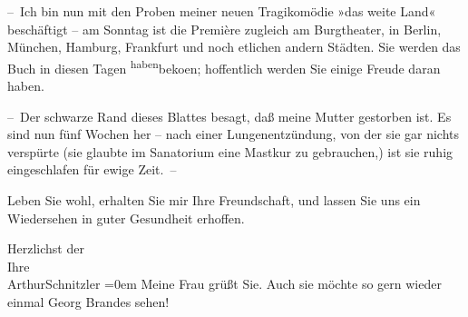 \pstart
           – Ich bin nun mit den Proben meiner {\pb}neuen
               Tragikomödie »das weite Land« beschäftigt – am
               Sonntag ist die Première zugleich am Burgtheater,
               in Berlin, München, Hamburg, Frankfurt und noch etlichen andern Städten. Sie werden das Buch in diesen Tagen \substVorne{}\textsuperscript{haben}\substDazwischen{}beko{\geminationm}en\substHinten{}; hoffentlich werden Sie einige Freude daran haben.\pend
           
\pstart
           – Der schwarze Rand dieses Blattes besagt, daß meine Mutter gestorben ist. Es sind nun fünf
               Wochen her – nach einer {\pb}Lungenentzündung, von der
               sie gar nichts verspürte (sie glaubte im Sanatorium eine Mastkur zu gebrauchen,) ist
               sie ruhig eingeschlafen für ewige Zeit. –\pend
           
\pstart
           Leben Sie wohl, erhalten Sie mir Ihre Freundschaft, und lassen Sie uns ein
               Wiedersehen in guter Gesundheit erhoffen.\pend
           
\pstart
           Herzlichst der{\\[\baselineskip]}Ihre{\\[\baselineskip]}\spacefill\mbox{ArthurSchnitzler}\pend
           \leftskip=0em{}
\pstart
           \noindent{}Meine Frau grüßt Sie. Auch
                  sie möchte so gern wieder einmal Georg Brandes sehen!\pend
           \endnumbering{}  \newcommand{\dateiname}{L02035}\newcommand{\titel}{Arthur Schnitzler an Georg Brandes, 12. 10. 1911}\newcommand{\editorInnen}{Martin Anton Müller und Gerd-Hermann Susen}
